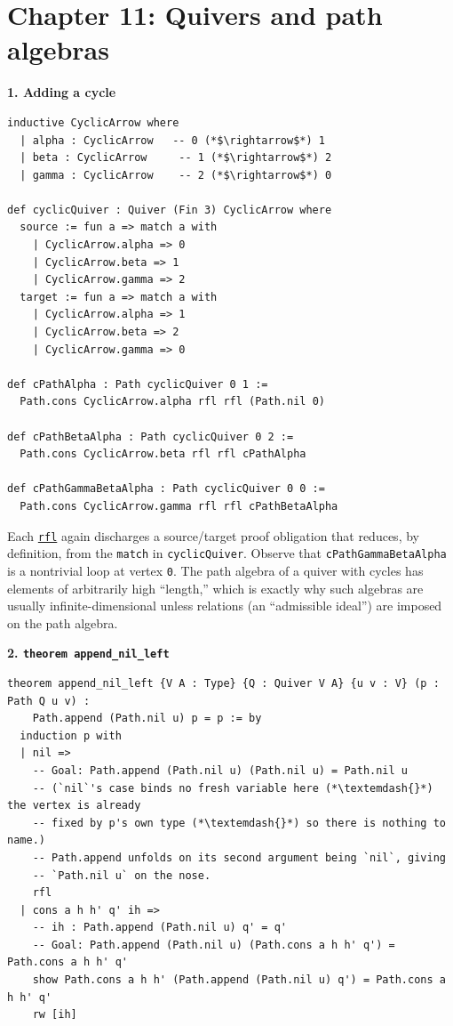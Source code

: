 \section{Chapter 11: Quivers and path algebras}\label{sec:14-appendix-solutions:10-chapter-11:1}

\textbf{1. Adding a cycle}

\begin{lstlisting}
inductive CyclicArrow where
  | alpha : CyclicArrow   -- 0 (*$\rightarrow$*) 1
  | beta : CyclicArrow     -- 1 (*$\rightarrow$*) 2
  | gamma : CyclicArrow    -- 2 (*$\rightarrow$*) 0

def cyclicQuiver : Quiver (Fin 3) CyclicArrow where
  source := fun a => match a with
    | CyclicArrow.alpha => 0
    | CyclicArrow.beta => 1
    | CyclicArrow.gamma => 2
  target := fun a => match a with
    | CyclicArrow.alpha => 1
    | CyclicArrow.beta => 2
    | CyclicArrow.gamma => 0

def cPathAlpha : Path cyclicQuiver 0 1 :=
  Path.cons CyclicArrow.alpha rfl rfl (Path.nil 0)

def cPathBetaAlpha : Path cyclicQuiver 0 2 :=
  Path.cons CyclicArrow.beta rfl rfl cPathAlpha

def cPathGammaBetaAlpha : Path cyclicQuiver 0 0 :=
  Path.cons CyclicArrow.gamma rfl rfl cPathBetaAlpha
\end{lstlisting}

Each \href{https://lean-lang.org/doc/reference/latest/Tactic-Proofs/Tactic-Reference/}{\texttt{rfl}} again discharges a source/target proof obligation that reduces, by definition, from the \texttt{match} in \texttt{cyclicQuiver}. Observe that \texttt{cPathGammaBetaAlpha} is a nontrivial loop at vertex \texttt{0}. The path algebra of a quiver with cycles has elements of arbitrarily high ``length,'' which is exactly why such algebras are usually infinite-dimensional unless relations (an ``admissible ideal'') are imposed on the path algebra.

\textbf{2. \texttt{theorem append\_\allowbreak{}nil\_\allowbreak{}left}}

\begin{lstlisting}
theorem append_nil_left {V A : Type} {Q : Quiver V A} {u v : V} (p : Path Q u v) :
    Path.append (Path.nil u) p = p := by
  induction p with
  | nil =>
    -- Goal: Path.append (Path.nil u) (Path.nil u) = Path.nil u
    -- (`nil`'s case binds no fresh variable here (*\textemdash{}*) the vertex is already
    -- fixed by p's own type (*\textemdash{}*) so there is nothing to name.)
    -- Path.append unfolds on its second argument being `nil`, giving
    -- `Path.nil u` on the nose.
    rfl
  | cons a h h' q' ih =>
    -- ih : Path.append (Path.nil u) q' = q'
    -- Goal: Path.append (Path.nil u) (Path.cons a h h' q') = Path.cons a h h' q'
    show Path.cons a h h' (Path.append (Path.nil u) q') = Path.cons a h h' q'
    rw [ih]
\end{lstlisting}

